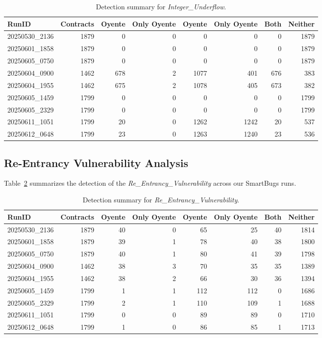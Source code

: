 \documentclass{article}
\newcommand\OY{Oyente}
\newcommand\OYp{\OY\raisebox{0.3ex}{\smaller +}}
\newcommand\CGTrbcA{20250530\_2136}%
\newcommand\CGTrbcB{20250601\_1858}%
\newcommand\CGTrbcC{20250605\_0750}%
\newcommand\CGTsscA{20250604\_0900}%
\newcommand\CGTsscB{20250604\_1955}%
\newcommand\SKCrbcA{20250605\_1459}%
\newcommand\SKCrbcB{20250605\_2329}%
\newcommand\SKCsscA{20250611\_1051}%
\newcommand\SKCsscB{20250612\_0648}%
\begin{document}
	\begin{table}[ht]
		\centering
		\begin{tabular}{lrrrrrrr}
			\toprule
			\textbf{RunID} & \textbf{Contracts} & \textbf{\OY} & \textbf{Only \OY} & \textbf{\OYp} & \textbf{Only \OYp} & \textbf{Both} & \textbf{Neither} \\
			\midrule
			\CGTrbcA & 1879 & 0 & 0 & 0 & 0 & 0 & 1879 \\
			\CGTrbcB & 1879 & 0 & 0 & 0 & 0 & 0 & 1879 \\
			\CGTrbcC & 1879 & 0 & 0 & 0 & 0 & 0 & 1879 \\
			\CGTsscA & 1462 & 678 & 2 & 1077 & 401 & 676 & 383 \\
			\CGTsscB & 1462 & 675 & 2 & 1078 & 405 & 673 & 382  \\
			\SKCrbcA & 1799 & 0 & 0 & 0 & 0 & 0 & 1799 \\
			\SKCrbcB & 1799 & 0 & 0 & 0 & 0 & 0 & 1799 \\
			\SKCsscA & 1799 & 20 & 0 & 1262 & 1242 & 20 & 537  \\
			\SKCsscB & 1799 & 23 & 0 & 1263 & 1240 & 23 & 536  \\
			\bottomrule
		\end{tabular}
		\caption{Detection summary for \emph{Integer\_Underflow}.}
		\label{tab:underflow-results}
	\end{table}

	\subsection{Re-Entrancy Vulnerability Analysis}
	Table~\ref{tab:reentrancy-results} summarizes the detection of the \emph{Re\_Entrancy\_Vulnerability} across our SmartBugs runs.

	\begin{table}[ht]
		\centering
		\begin{tabular}{lrrrrrrr}
			\toprule
			\textbf{RunID} & \textbf{Contracts} & \textbf{\OY} & \textbf{Only \OY} & \textbf{\OYp} & \textbf{Only \OYp} & \textbf{Both} & \textbf{Neither} \\
			\midrule
			\CGTrbcA & 1879 & 40 & 0 & 65 & 25 & 40 & 1814 \\
			\CGTrbcB & 1879 & 39 & 1 & 78 & 40 & 38 & 1800 \\
			\CGTrbcC & 1879 & 40 & 1 & 80 & 41 & 39 & 1798 \\
			\CGTsscA & 1462 & 38  & 3 & 70 & 35 & 35   & 1389 \\
			\CGTsscB & 1462 & 38 & 2 & 66 & 30 & 36 & 1394 \\
			\SKCrbcA & 1799 & 1 & 1 & 112 & 112 & 0    & 1686 \\
			\SKCrbcB & 1799 & 2 & 1 & 110 & 109 & 1    & 1688 \\
			\SKCsscA & 1799 & 0 & 0 & 89 & 89 & 0 & 1710 \\
			\SKCsscB & 1799 & 1 & 0 & 86 & 85 & 1 & 1713 \\
			\bottomrule
		\end{tabular}
		\caption{Detection summary for \emph{Re\_Entrancy\_Vulnerability}.}
		\label{tab:reentrancy-results}
	\end{table}
\end{document}
